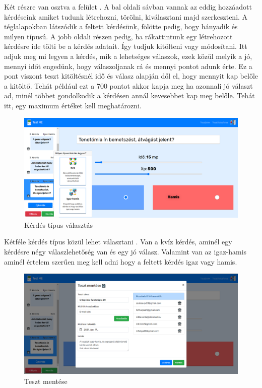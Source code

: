 Két részre van osztva a felület . A bal oldali sávban vannak az eddig hozzáadott kérdéseink amiket tudunk létrehozni, törölni, kiválasztani majd szerkeszteni. A téglalapokban látszódik a feltett kérdésünk, fölötte pedig, hogy hányadik és milyen típusú. A jobb oldali részen pedig, ha rákattintunk egy létrehozott kérdésre ide tölti be a kérdés adatait. Így tudjuk kitölteni vagy módosítani. Itt adjuk meg mi legyen a kérdés, mik a lehetséges válaszok, ezek közül melyik a jó, mennyi időt engedünk, hogy válaszoljanak rá és mennyi pontot adunk érte. Ez a pont viszont teszt kitöltésnél idő és válasz alapján dől el, hogy mennyit kap belőle a kitöltő. Tehát például ezt a 700 pontot akkor kapja meg ha azonnali jó választ ad, minél többet gondolkodik a kérdésen annál kevesebbet kap meg belőle. Tehát itt, egy maximum értéket kell meghatározni.

\begin{figure}[H]
    \centering
    \includegraphics[width=\linewidth]{images/make_test2.png}
    \caption{Kérdés típus választás}
    \label{fig:make_test2}
\end{figure}

Kétféle kérdés típus közül lehet választani . Van a kvíz kérdés, aminél egy kérdésre négy válaszlehetőség van és egy jó válasz. Valamint van az igaz-hamis aminél értelem szerűen meg kell adni hogy a feltett kérdés igaz vagy hamis.


\begin{figure}[H]
    \centering
    \includegraphics[width=\linewidth]{images/make_test3.png}
    \caption{Teszt mentése}
    \label{fig:make_test3}
\end{figure}


